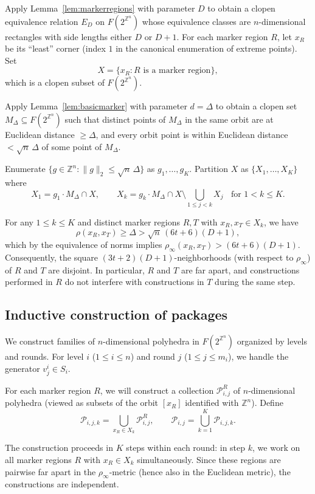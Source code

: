 \documentclass{amsart}
\theoremstyle{definition}
\begin{document}
Apply Lemma~\ref{lem:markerregions} with parameter $D$ to obtain a clopen
equivalence relation $E_D$ on $F(2^{\mathbb{Z}^n})$ whose equivalence
classes are $n$-dimensional rectangles with side
lengths either $D$ or $D+1$. For each marker region $R$, let $x_R$ be its
``least'' corner (index $1$ in the canonical enumeration of extreme
points). Set
\[
X=\{x_R\colon R\text{ is a marker region}\},
\]
which is a clopen subset of $F(2^{\mathbb{Z}^n})$.

Apply Lemma~\ref{lem:basicmarker} with parameter $d=\Delta$ to obtain a
clopen set $M_\Delta\subseteq F(2^{\mathbb{Z}^n})$ such that distinct
points of $M_\Delta$ in the same orbit are at Euclidean distance
$\geq\Delta$, and every orbit point is within Euclidean distance
$<\sqrt{n}\,\Delta$ of some point of $M_\Delta$.

Enumerate $\{g\in\mathbb{Z}^n\colon \|g\|_2\leq \sqrt{n}\,\Delta\}$ as
$g_1,\dots,g_K$. Partition $X$ as $\{X_1,\dots,X_K\}$ where
\[
X_1=g_1\cdot M_\Delta\cap X,\qquad
X_k=g_k\cdot M_\Delta\cap X\setminus
\bigcup_{1\leq j<k}X_j\;\; \mbox{ for $1<k\leq K$.}
\]

For any $1\leq k\leq K$ and distinct marker regions $R,T$ with
$x_R,x_T\in X_k$, we have
\[
\rho(x_R,x_T)\geq\Delta>\sqrt{n}\,(6t+6)(D+1),
\]
which by the equivalence of norms implies
$\rho_\infty(x_R,x_T)>(6t+6)(D+1)$. Consequently, the square
$(3t+2)(D+1)$-neighborhoods (with respect to $\rho_\infty$) of $R$ and
$T$ are disjoint. In particular, $R$ and $T$ are far apart, and
constructions performed in $R$ do not interfere with constructions in
$T$ during the same step.

\subsection{Inductive construction of packages}

We construct families of $n$-dimensional polyhedra in $F(2^{\mathbb{Z}^n})$
organized by levels and rounds. For level $i$ ($1\leq i\leq n$) and round
$j$ ($1\leq j\leq m_i$), we handle the generator $v_j^i\in S_i$.

For each marker region $R$, we will construct a collection
$\mathcal{P}_{i,j}^R$ of $n$-dimensional polyhedra (viewed as subsets of
the orbit $[x_R]$ identified with $\mathbb{Z}^n$). Define
\[
\mathcal{P}_{i,j,k}=\bigcup_{x_R\in X_k}\mathcal{P}_{i,j}^R,\qquad
\mathcal{P}_{i,j}=\bigcup_{k=1}^K\mathcal{P}_{i,j,k}.
\]

The construction proceeds in $K$ steps within each round: in step $k$, we
work on all marker regions $R$ with $x_R\in X_k$ simultaneously. Since
these regions are pairwise far apart in the $\rho_\infty$-metric (hence
also in the Euclidean metric), the constructions are independent.
\end{document}
